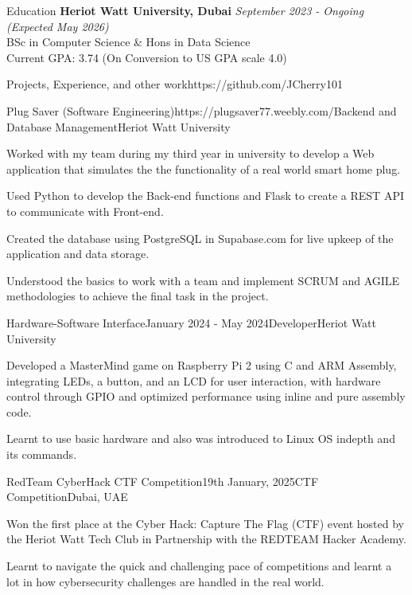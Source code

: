 \documentclass{resume}
\begin{document}
  \begin{rSection}{Education}
    {\bf Heriot Watt University, Dubai} \hfill {\em September 2023 - Ongoing (Expected May 2026)} \\ 
    { BSc in Computer Science \& Hons in Data Science} \smallskip \\
    Current GPA: 3.74 (On Conversion to US GPA scale 4.0)
  \end{rSection}
  
  \begin{rSection}{Projects, Experience, and other work}{https://github.com/JCherry101}
  
    \begin{rSubsection}{Plug Saver (Software Engineering)}{https://plugsaver77.weebly.com/}{Backend and Database Management}{Heriot Watt University}
    \item Worked with my team during my third year in university to develop a Web application that simulates the the functionality of a real world smart home plug.
    \item Used Python to develop the Back-end functions and Flask to create a REST API to communicate with Front-end.
    \item Created the database using PostgreSQL in Supabase.com for live upkeep of the application and data storage.
    \item Understood the basics to work with a team and implement SCRUM and AGILE methodologies to achieve the final task in the project.
    \end{rSubsection}
  
    \begin{rSubsection}{Hardware-Software Interface}{January 2024 - May 2024}{Developer}{Heriot Watt University}
    \item Developed a MasterMind game on Raspberry Pi 2 using C and ARM Assembly, integrating LEDs, a button, and an LCD for user interaction, with hardware control through GPIO and optimized performance using inline and pure assembly code.
    \item Learnt to use basic hardware and also was introduced to Linux OS indepth and its commands.
    \end{rSubsection}

    \begin{rSubsection}{RedTeam CyberHack CTF Competition}{19th January, 2025}{CTF Competition}{Dubai, UAE}
    \item Won the first place at the Cyber Hack: Capture The Flag (CTF) event hosted by the Heriot Watt Tech Club in Partnership with the REDTEAM Hacker Academy.
    \item Learnt to navigate the quick and challenging pace of competitions and learnt a lot in how cybersecurity challenges are handled in the real world.
    \end{rSubsection}


\end{rSection}
\end{document}
